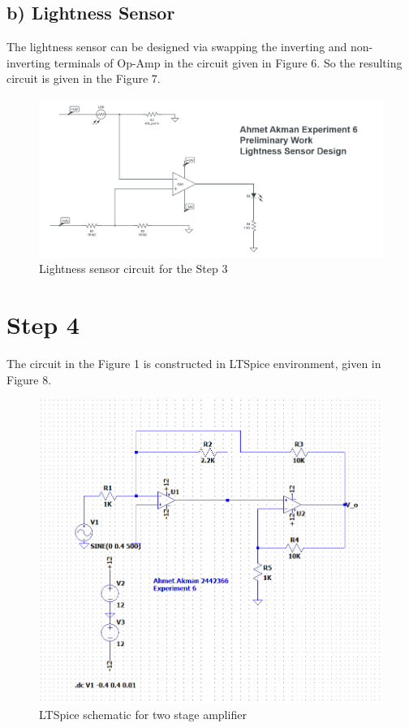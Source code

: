 \documentclass[letterpaper,12pt]{article}
\begin{document}
\subsection{b) Lightness Sensor}
The lightness sensor can be designed via swapping the inverting and non-inverting terminals of Op-Amp  in the circuit given in Figure 6. So the resulting circuit is given in the Figure 7.
\begin{figure}[H]
	\centering
   \includegraphics[width=1\textwidth]{lightness.png}
   \caption{Lightness sensor circuit for the Step 3}
\end{figure} 

\section{Step 4}
The circuit in the Figure 1 is constructed in LTSpice environment, given in Figure 8.
\begin{figure}[H]
	\centering
   \includegraphics[width=1\textwidth]{Pre1.png}
   \caption{LTSpice schematic for two stage amplifier}
\end{figure} 
\end{document}
